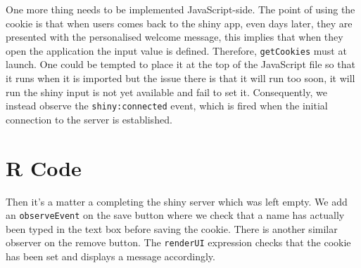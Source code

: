 \documentclass[
]{krantz}
\makeatletter
\newenvironment{Shaded}{\begin{snugshade}}{\end{snugshade}}
\newcommand{\AttributeTok}[1]{\textcolor[rgb]{0.61,0.61,0.61}{#1}}
\newcommand{\CommentTok}[1]{\textcolor[rgb]{0.37,0.37,0.37}{\textit{#1}}}
\newcommand{\KeywordTok}[1]{\textcolor[rgb]{0.27,0.27,0.27}{\textbf{#1}}}
\newcommand{\NormalTok}[1]{#1}
\newcommand{\OperatorTok}[1]{\textcolor[rgb]{0.43,0.43,0.43}{\textbf{#1}}}
\newcommand{\StringTok}[1]{\textcolor[rgb]{0.5,0.5,0.5}{#1}}
\newenvironment{kframe}{%
\medskip{}
\setlength{\fboxsep}{.8em}
 \def\at@end@of@kframe{}%
 \ifinner\ifhmode%
  \def\at@end@of@kframe{\end{minipage}}%
  \begin{minipage}{\columnwidth}%
 \fi\fi%
 \def\FrameCommand##1{\hskip\@totalleftmargin \hskip-\fboxsep
 \colorbox{shadecolor}{##1}\hskip-\fboxsep
     \hskip-\linewidth \hskip-\@totalleftmargin \hskip\columnwidth}%
 \MakeFramed {\advance\hsize-\width
   \@totalleftmargin\z@ \linewidth\hsize
   \@setminipage}}%
 {\par\unskip\endMakeFramed%
 \at@end@of@kframe}
\renewenvironment{Shaded}{\begin{kframe}}{\end{kframe}}
\makeatother
\begin{document}
One more thing needs to be implemented JavaScript-side. The point of using the cookie is that when users comes back to the shiny app, even days later, they are presented with the personalised welcome message, this implies that when they open the application the input value is defined. Therefore, \texttt{getCookies} must at launch. One could be tempted to place it at the top of the JavaScript file so that it runs when it is imported but the issue there is that it will run too soon, it will run the shiny input is not yet available and fail to set it. Consequently, we instead observe the \texttt{shiny:connected} event, which is fired when the initial connection to the server is established.

\begin{Shaded}
\end{Shaded}

\hypertarget{r-code}{%
\section{R Code}\label{r-code}}

Then it's a matter a completing the shiny server which was left empty. We add an \texttt{observeEvent} on the save button where we check that a name has actually been typed in the text box before saving the cookie. There is another similar observer on the remove button. The \texttt{renderUI} expression checks that the cookie has been set and displays a message accordingly.
\end{document}
